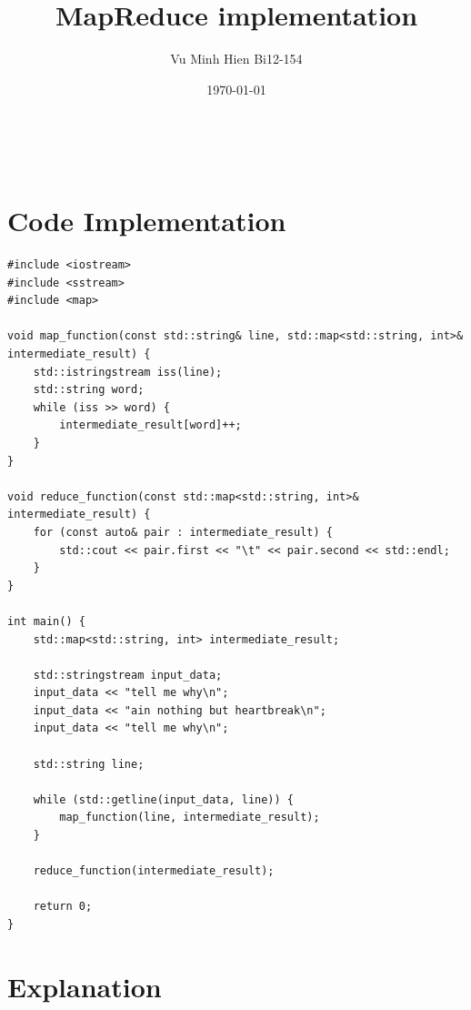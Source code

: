 \documentclass{article}
\begin{document}
\title{ MapReduce implementation}
\author{Vu Minh Hien Bi12-154}
\date{\today}

\maketitle

\

\maketitle

\section{Code Implementation}

\lstset{language=C++}
\begin{lstlisting}
#include <iostream>
#include <sstream>
#include <map>

void map_function(const std::string& line, std::map<std::string, int>& intermediate_result) {
    std::istringstream iss(line);
    std::string word;
    while (iss >> word) {
        intermediate_result[word]++;
    }
}

void reduce_function(const std::map<std::string, int>& intermediate_result) {
    for (const auto& pair : intermediate_result) {
        std::cout << pair.first << "\t" << pair.second << std::endl;
    }
}

int main() {
    std::map<std::string, int> intermediate_result;

    std::stringstream input_data;
    input_data << "tell me why\n";
    input_data << "ain nothing but heartbreak\n";
    input_data << "tell me why\n";

    std::string line;

    while (std::getline(input_data, line)) {
        map_function(line, intermediate_result);
    }

    reduce_function(intermediate_result);

    return 0;
}
\end{lstlisting}

\section{Explanation}
\end{document}
